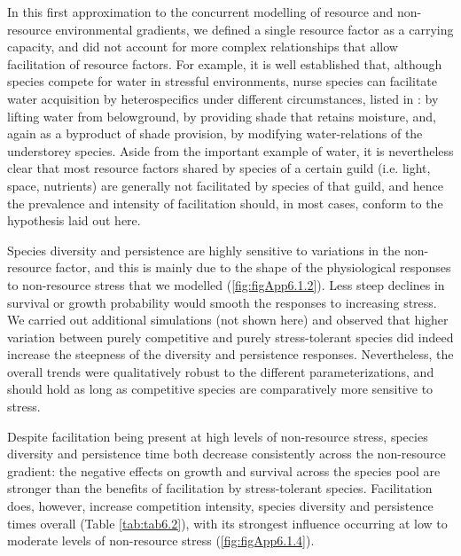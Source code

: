 In this first approximation to the concurrent modelling of resource and non-resource environmental gradients, we defined a single resource factor as a carrying capacity, and did not account for more complex relationships that allow facilitation of resource factors. For example, it is well established that, although species compete for water in stressful environments, nurse species can facilitate water acquisition by heterospecifics under different circumstances, listed in \cite{Maestre2009}: by lifting water from belowground, by providing shade that retains moisture, and, again as a byproduct of shade provision, by modifying water-relations of the understorey species. Aside from the important example of water, it is nevertheless clear that most resource factors shared by species of a certain guild (i.e. light, space, nutrients) are generally not facilitated by species of that guild, and hence the prevalence and intensity of facilitation should, in most cases, conform to the hypothesis laid out here.

Species diversity and persistence are highly sensitive to variations in the non-resource factor, and this is mainly due to the shape of the physiological responses to non-resource stress that we modelled (\cref{fig:figApp6.1.2}). Less steep declines in survival or growth probability would smooth the responses to increasing stress. We carried out additional simulations (not shown here) and observed that higher variation between purely competitive and purely stress-tolerant species did indeed increase the steepness of the diversity and persistence responses. Nevertheless, the overall trends were qualitatively robust to the different parameterizations, and should hold as long as competitive species are comparatively more sensitive to stress.

Despite facilitation being present at high levels of non-resource stress, species diversity and persistence time both decrease consistently across the non-resource gradient: the negative effects on growth and survival across the species pool are stronger than the benefits of facilitation by stress-tolerant species. Facilitation does, however, increase competition intensity, species diversity and persistence times overall (Table \ref{tab:tab6.2}), with its strongest influence occurring at low to moderate levels of non-resource stress (\cref{fig:figApp6.1.4}).

